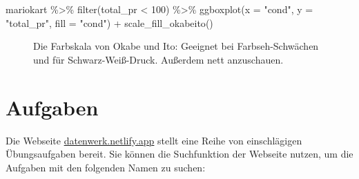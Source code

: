 \documentclass[
  letterpaper,
]{scrbook}
\newenvironment{Shaded}{\begin{snugshade}}{\end{snugshade}}
\newcommand{\AttributeTok}[1]{\textcolor[rgb]{0.40,0.45,0.13}{#1}}
\newcommand{\DecValTok}[1]{\textcolor[rgb]{0.68,0.00,0.00}{#1}}
\newcommand{\FunctionTok}[1]{\textcolor[rgb]{0.28,0.35,0.67}{#1}}
\newcommand{\NormalTok}[1]{\textcolor[rgb]{0.00,0.23,0.31}{#1}}
\newcommand{\SpecialCharTok}[1]{\textcolor[rgb]{0.37,0.37,0.37}{#1}}
\newcommand{\StringTok}[1]{\textcolor[rgb]{0.13,0.47,0.30}{#1}}
\theoremstyle{definition}
\theoremstyle{definition}
\theoremstyle{definition}
\theoremstyle{remark}
\begin{document}
\begin{Shaded}
\begin{Highlighting}[]
\NormalTok{mariokart }\SpecialCharTok{\%\textgreater{}\%} 
  \FunctionTok{filter}\NormalTok{(total\_pr }\SpecialCharTok{\textless{}} \DecValTok{100}\NormalTok{) }\SpecialCharTok{\%\textgreater{}\%} 
  \FunctionTok{ggboxplot}\NormalTok{(}\AttributeTok{x =} \StringTok{"cond"}\NormalTok{, }\AttributeTok{y =} \StringTok{"total\_pr"}\NormalTok{, }\AttributeTok{fill =} \StringTok{"cond"}\NormalTok{) }\SpecialCharTok{+}
  \FunctionTok{scale\_fill\_okabeito}\NormalTok{()}
\end{Highlighting}
\end{Shaded}

\begin{figure}[H]


\caption{\label{fig-okabe}Die Farbskala von Okabe und Ito: Geeignet bei
Farbseh-Schwächen und für Schwarz-Weiß-Druck. Außerdem nett
anzuschauen.}

\end{figure}%

\section{Aufgaben}\label{aufgaben-3}

Die Webseite \href{https://datenwerk.netlify.app}{datenwerk.netlify.app}
stellt eine Reihe von einschlägigen Übungsaufgaben bereit. Sie können
die Suchfunktion der Webseite nutzen, um die Aufgaben mit den folgenden
Namen zu suchen:
\end{document}
